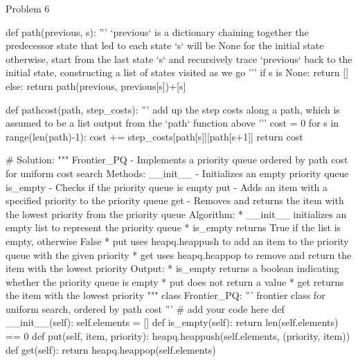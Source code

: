 \begin{problem}{Problem 6}
\begin{highlight}[Solution]
\begin{code}[Python]
    def path(previous, s): 
        '''
        `previous` is a dictionary chaining together the predecessor state that led to each state
        `s` will be None for the initial state
        otherwise, start from the last state `s` and recursively trace `previous` back to the initial state,
        constructing a list of states visited as we go
        '''
        if s is None:
            return []
        else:
            return path(previous, previous[s])+[s]
    
    def pathcost(path, step_costs):
        '''
        add up the step costs along a path, which is assumed to be a list output from the `path` function above
        '''
        cost = 0
        for s in range(len(path)-1):
            cost += step_costs[path[s]][path[s+1]]
        return cost
    
    # Solution:
    """ Frontier_PQ - Implements a priority queue ordered by path cost for uniform cost search
        Methods:
            __init__ - Initializes an empty priority queue
            is_empty - Checks if the priority queue is empty
            put - Adds an item with a specified priority to the priority queue
            get - Removes and returns the item with the lowest priority from the priority queue
        Algorithm:
            * __init__ initializes an empty list to represent the priority queue
            * is_empty returns True if the list is empty, otherwise False
            * put uses heapq.heappush to add an item to the priority queue with the given priority
            * get uses heapq.heappop to remove and return the item with the lowest priority
        Output:
            * is_empty returns a boolean indicating whether the priority queue is empty
            * put does not return a value
            * get returns the item with the lowest priority
    """
    class Frontier_PQ:
        ''' frontier class for uniform search, ordered by path cost '''
        # add your code here
        def __init__(self):
            self.elements = []
        def is_empty(self):
            return len(self.elements) == 0
        def put(self, item, priority):
            heapq.heappush(self.elements, (priority, item))
        def get(self):
            return heapq.heappop(self.elements)                  
    

\end{code}
\end{highlight}
\end{problem}
